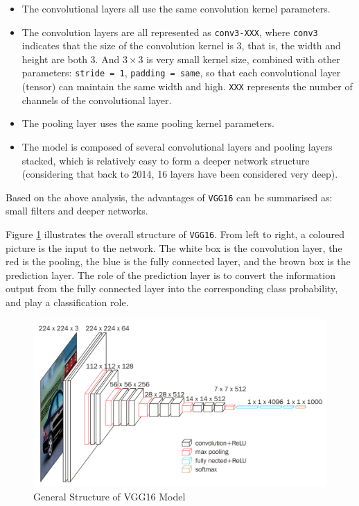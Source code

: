 \begin{itemize}
    \item The convolutional layers all use the same convolution kernel parameters.
    \item The convolution layers are all represented as \verb|conv3-XXX|, where \verb|conv3| indicates that the size of the convolution kernel is 3, that is, the width and height are both 3. And $3\times3$ is very small kernel size, combined with other parameters: \verb|stride = 1|, \verb|padding = same|, so that each convolutional layer (tensor) can maintain the same width and high. \verb|XXX| represents the number of channels of the convolutional layer.
    \item The pooling layer uses the same pooling kernel parameters. 
    \item The model is composed of several convolutional layers and pooling layers stacked, which is relatively easy to form a deeper network structure (considering that back to 2014, 16 layers have been considered very deep).
    
\end{itemize}

Based on the above analysis, the advantages of \verb|VGG16| can be summarised as: small filters and deeper networks.

Figure \ref{fig:vgg16strucure} illustrates the overall structure of \verb|VGG16|. From left to right, a coloured picture is the input to the network. The white box is the convolution layer, the red is the pooling, the blue is the fully connected layer, and the brown box is the prediction layer. The role of the prediction layer is to convert the information output from the fully connected layer into the corresponding class probability, and play a classification role.

\begin{figure}[h!]
\centering
\includegraphics[width=1\textwidth]{vgg16struc.pdf}
\caption{General Structure of VGG16 Model \cite{vgg16}}
\label{fig:vgg16strucure}
\end{figure}

